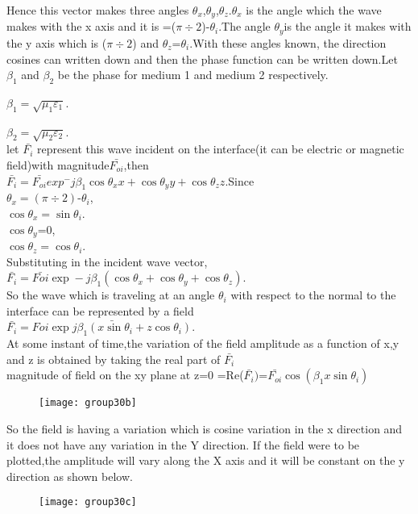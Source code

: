 Hence this vector makes three angles $\theta_x$,$\theta_y$,$\theta_z$.$\theta_x$ is the angle which the wave makes with the x axis and it is =($\pi\div2$)-$\theta_i$.The angle $\theta_y$is the angle it makes with the y axis which is ($\pi\div2$) and $\theta_z$=$\theta_i$.With these angles known, the direction cosines can  written down  and then   the phase function can be written down.Let $\beta_1$ and $\beta_2$ be the phase for medium 1 and medium 2 respectively.

$\beta_1=\sqrt{\mu_1\varepsilon_1}$.

$\beta_2=\sqrt{\mu_2\varepsilon_2}$.\\
let $\bar{F_i}$ represent this wave incident on the interface(it can be electric or magnetic field)with magnitude$\bar{F_{oi}}$,then\\ $\bar{F_{i}}=\bar{F_{oi}}exp^-j\beta_1{\cos\theta_xx +\cos\theta_yy+\cos\theta_zz}$.Since \\$\theta_x=(\pi\div2)$-$\theta_i$,\\$\cos\theta _x=\sin \theta_i$.\\$\cos \theta_y$=0,\\$\cos\theta_z=\cos \theta_i$.\\Substituting in the incident wave vector,\\$\bar{F_i}=\bar{F{oi}}\exp -j\beta_1(\cos \theta_x+\cos \theta_y+\cos \theta_z)$.\\So the wave  which is traveling at an angle $\theta_i$ with respect to the normal to the interface can be represented by a field\\ $\bar{F_i}=\bar{F{oi }\exp j\beta_1(x\sin \theta_i+z\cos \theta_i)}$.\\At some instant of time,the variation of the field amplitude as a function of x,y and z is obtained by taking the real part of $\bar{F_i}$
\\ magnitude of field on the xy plane at z=0 =Re($\bar{F_i})$=$\bar{F_{oi}}\cos (\beta_1x\sin \theta_i)$
\begin{figure}
\centering
\texttt{[image: group30b]}
\caption{}
\label{fig:group30b}
\end{figure}


So the field is having a variation which is cosine variation in the x direction and it does not have any variation in the Y direction. If the field were to be plotted,the amplitude will vary along the X axis and it will be constant on the y direction as shown below.

\begin{figure}
\centering
\texttt{[image: group30c]}
\caption{}
\label{fig:group30c}
\end{figure}

